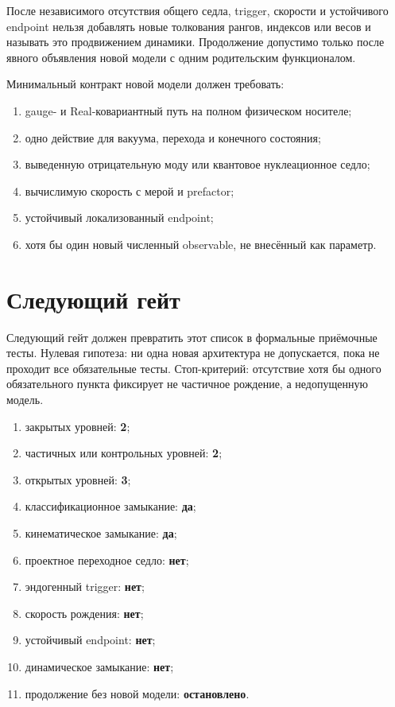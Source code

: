 \begin{nogocriterion}
После независимого отсутствия общего седла, trigger, скорости и устойчивого
endpoint нельзя добавлять новые толкования рангов, индексов или весов и
называть это продвижением динамики. Продолжение допустимо только после
явного объявления новой модели с одним родительским функционалом.
\end{nogocriterion}

Минимальный контракт новой модели должен требовать:
\begin{enumerate}
 \item gauge- и Real-ковариантный путь на полном физическом носителе;
 \item одно действие для вакуума, перехода и конечного состояния;
 \item выведенную отрицательную моду или квантовое нуклеационное седло;
 \item вычислимую скорость с мерой и prefactor;
 \item устойчивый локализованный endpoint;
 \item хотя бы один новый численный observable, не внесённый как параметр.
\end{enumerate}

\section{Следующий гейт}

Следующий гейт
должен превратить этот список в формальные приёмочные тесты. Нулевая
гипотеза: ни одна новая архитектура не допускается, пока не проходит все
обязательные тесты. Стоп-критерий: отсутствие хотя бы одного обязательного
пункта фиксирует не частичное рождение, а недопущенную модель.

\begin{protocol}
\begin{enumerate}
 \item закрытых уровней: \textbf{2};
 \item частичных или контрольных уровней: \textbf{2};
 \item открытых уровней: \textbf{3};
 \item классификационное замыкание: \textbf{да};
 \item кинематическое замыкание: \textbf{да};
 \item проектное переходное седло: \textbf{нет};
 \item эндогенный trigger: \textbf{нет};
 \item скорость рождения: \textbf{нет};
 \item устойчивый endpoint: \textbf{нет};
 \item динамическое замыкание: \textbf{нет};
 \item продолжение без новой модели: \textbf{остановлено}.
\end{enumerate}
\end{protocol}

